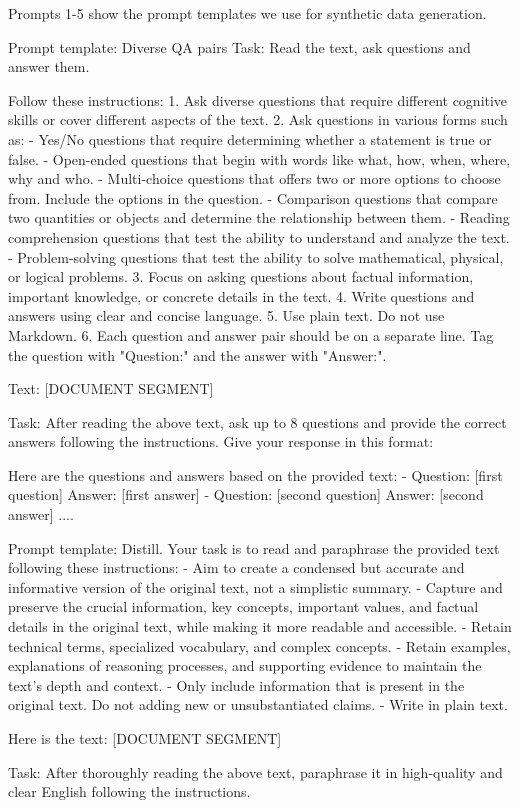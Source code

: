 \documentclass[11pt]{article}
\begin{document}
Prompts 1-5 show the prompt templates we use for synthetic data generation.

\begin{table}[!hbt]
\begin{prompt}{Prompt template: Diverse QA pairs}
Task: Read the text, ask questions and answer them.

Follow these instructions:
1. Ask diverse questions that require different cognitive skills or cover different aspects of the text.
2. Ask questions in various forms such as:
  - Yes/No questions that require determining whether a statement is true or false.
  - Open-ended questions that begin with words like what, how, when, where, why and who.
  - Multi-choice questions that offers two or more options to choose from. Include the options in the question.
  - Comparison questions that compare two quantities or objects and determine the relationship between them.
  - Reading comprehension questions that test the ability to understand and analyze the text.
  - Problem-solving questions that test the ability to solve mathematical, physical, or logical problems.
3. Focus on asking questions about factual information, important knowledge, or concrete details in the text.
4. Write questions and answers using clear and concise language.
5. Use plain text. Do not use Markdown.
6. Each question and answer pair should be on a separate line. Tag the question with "Question:" and the answer with "Answer:".

Text:
[DOCUMENT SEGMENT]

Task:
After reading the above text, ask up to 8 questions and provide the correct answers following the instructions. Give your response in this format:

Here are the questions and answers based on the provided text:
- Question: [first question] Answer: [first answer]
- Question: [second question] Answer: [second answer]
....
\end{prompt}
\end{table}


\begin{table}[!hbt]
\begin{prompt}{Prompt template: Distill.}
Your task is to read and paraphrase the provided text following these instructions:
- Aim to create a condensed but accurate and informative version of the original text, not a simplistic summary.
- Capture and preserve the crucial information, key concepts, important values, and factual details in the original text, while making it more readable and accessible.
- Retain technical terms, specialized vocabulary, and complex concepts.
- Retain examples, explanations of reasoning processes, and supporting evidence to maintain the text's depth and context.
- Only include information that is present in the original text. Do not adding new or unsubstantiated claims.
- Write in plain text.

Here is the text:
[DOCUMENT SEGMENT]

Task:
After thoroughly reading the above text, paraphrase it in high-quality and clear English following the instructions.
\end{prompt}
\end{table}
\end{document}
